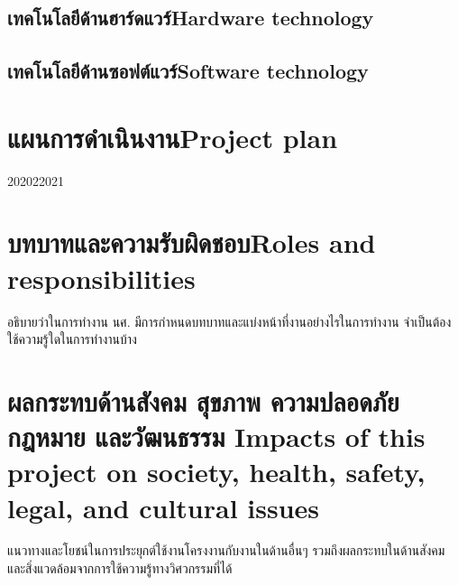 \subsection{\ifcpe เทคโนโลยีด้านฮาร์ดแวร์\else Hardware technology\fi}

\subsection{\ifcpe เทคโนโลยีด้านซอฟต์แวร์\else Software technology\fi}

\section{\ifcpe แผนการดำเนินงาน\else Project plan\fi}

\begin{plan}{6}{2020}{2}{2021}
\end{plan}

\section{\ifcpe บทบาทและความรับผิดชอบ\else Roles and responsibilities\fi}
อธิบายว่าในการทำงาน นศ. มีการกำหนดบทบาทและแบ่งหน้าที่งานอย่างไรในการทำงาน จำเป็นต้องใช้ความรู้ใดในการทำงานบ้าง

\section{\ifcpe%
ผลกระทบด้านสังคม สุขภาพ ความปลอดภัย กฎหมาย และวัฒนธรรม
\else%
Impacts of this project on society, health, safety, legal, and cultural issues
\fi}

แนวทางและโยชน์ในการประยุกต์ใช้งานโครงงานกับงานในด้านอื่นๆ รวมถึงผลกระทบในด้านสังคมและสิ่งแวดล้อมจากการใช้ความรู้ทางวิศวกรรมที่ได้
